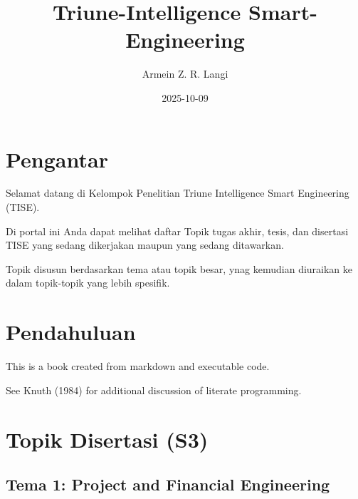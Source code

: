 \documentclass[
  letterpaper,
  DIV=11,
  numbers=noendperiod]{scrreprt}
\title{Triune-Intelligence Smart-Engineering}
\author{Armein Z. R. Langi}
\date{2025-10-09}
\renewcommand*\contentsname{Table of contents}
\newcommand\contentsname{Table of contents}
\begin{document}
\maketitle

\renewcommand*\contentsname{Table of contents}
{
\hypersetup{linkcolor=}
\setcounter{tocdepth}{2}
\tableofcontents
}


\chapter*{Pengantar}\label{pengantar}


Selamat datang di Kelompok Penelitian Triune Intelligence Smart
Engineering (TISE).

Di portal ini Anda dapat melihat daftar Topik tugas akhir, tesis, dan
disertasi TISE yang sedang dikerjakan maupun yang sedang ditawarkan.

Topik disusun berdasarkan tema atau topik besar, ynag kemudian diuraikan
ke dalam topik-topik yang lebih spesifik.


\chapter{Pendahuluan}\label{pendahuluan}

This is a book created from markdown and executable code.

See Knuth (1984) for additional discussion of literate programming.


\chapter{Topik Disertasi (S3)}\label{topik-disertasi-s3}

\section{Tema 1: Project and Financial
Engineering}\label{tema-1-project-and-financial-engineering}
\end{document}
